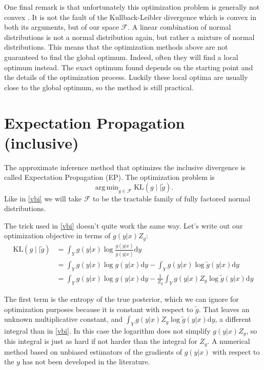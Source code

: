 \documentclass[12pt,vu]{adammath}
\newcommand\kl[2]{{\text{KL}({#1} \mid\mid {#2})}}
\DeclareMathOperator*{\argmin}{arg\,min}
\theoremstyle{plain}
\theoremstyle{definition}
\theoremstyle{remark}
\begin{document}
One final remark is that unfortunately this optimization problem is generally not convex \cite{varinf2016}.
It is not the fault of the Kullback-Leibler divergence which is convex in both its arguments, but of our space $\mathcal{F}$.
A linear combination of normal distributions is not a normal distribution again, but rather a mixture of normal distributions.
This means that the optimization methods above are not guaranteed to find the global optimum.
Indeed, often they will find a local optimum instead.
The exact optimum found depends on the starting point and the details of the optimization process.
Luckily these local optima are usually close to the global optimum, so the method is still practical.

\section{Expectation Propagation (inclusive)}\label{ep}
The approximate inference method that optimizes the inclusive divergence is called Expectation Propagation (EP).
The optimization problem is
$$\argmin_{\tilde{g} \in \mathcal{F}} \kl{g}{\tilde{g}}.$$
Like in \ref{vbi} we will take $\mathcal{F}$ to be the tractable family of fully factored normal distributions.

The trick used in \ref{vbi} doesn't quite work the same way.
Let's write out our optimization objective in terms of $g(y|x) Z_g$:
\begin{align*}
  \kl{g}{\tilde{g}} & = \int_Y g(y | x) \log \frac{g(y|x)}{\tilde{g}(y|x)} \mathrm{d}y \\
  &= \int_Y g(y | x) \log g(y|x) \mathrm{d}y - \int_Y g(y | x) \log \tilde{g}(y|x) \mathrm{d}y \\
  &= \int_Y g(y | x) \log g(y|x) \mathrm{d}y - \frac{1}{Z_g} \int_Y g(y | x) Z_g \log \tilde{g}(y|x) \mathrm{d}y
\end{align*}

The first term is the entropy of the true posterior, which we can ignore for optimization purposes because it is constant with respect to $\tilde{g}$.
That leaves an unknown multiplicative constant, and $\int_Y g(y | x) Z_g \log \tilde{g}(y|x) \mathrm{d}y$, a different integral than in \ref{vbi}.
In this case the logarithm does not simplify $g(y | x) Z_g$, so this integral is just as hard if not harder than the integral for $Z_g$.
A numerical method based on unbiased estimators of the gradients of $g(y | x)$ with respect to the $y$ has not been developed in the literature.
\end{document}
